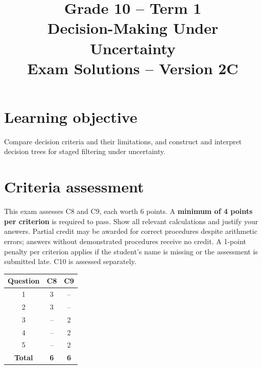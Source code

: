 \makeatletter
{}
\makeatother

\title{Grade 10 -- Term 1\\Decision-Making Under Uncertainty\\Exam Solutions -- Version 2C}
\author{}\date{}

\maketitle
\setcounter{tocdepth}{1}\setcounter{secnumdepth}{2}
\label{toc}\tableofcontents
\section*{Learning objective}
Compare decision criteria and their limitations, and construct and interpret decision trees for staged filtering under uncertainty.
\section*{Criteria assessment}
This exam assesses C8 and C9, each worth 6 points. A \textbf{minimum of 4 points per criterion} is required to pass. Show all relevant calculations and justify your answers. Partial credit may be awarded for correct procedures despite arithmetic errors; answers without demonstrated procedures receive no credit. A 1-point penalty per criterion applies if the student's name is missing or the assessment is submitted late. C10 is assessed separately.
\begin{center}
\begin{tabular}{|c|c|c|}
				\hline
				\textbf{Question} & \textbf{C8} & \textbf{C9} \\ \hline
				1 & 3 & -- \\ \hline
				2 & 3 & -- \\ \hline
				3 & -- & 2 \\ \hline
				4 & -- & 2 \\ \hline
				5 & -- & 2 \\ \hline
				\textbf{Total} & \textbf{6} & \textbf{6} \\ \hline
			\end{tabular}
\end{center}
